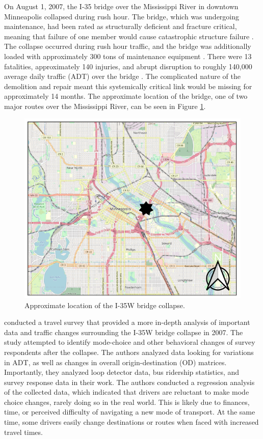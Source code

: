 On August 1, 2007, the I-35 bridge over the Mississippi River in downtown
Minneapolis collapsed
during rush hour. The bridge, which was undergoing maintenance, had been
rated as structurally
deficient and fracture critical, meaning that failure of one member would
cause catastrophic structure failure \citep{schaper2017}.
The collapse occurred during rush hour traffic, and the bridge
was additionally loaded
with approximately 300 tons of maintenance equipment \citep{schaper2017}.
There were 13
fatalities,
approximately 140 injuries, and abrupt disruption to roughly 140,000
average daily traffic (ADT)
over the bridge \citep{zhu2010}. The complicated nature of the demolition
and repair meant
this systemically critical link would be missing for approximately 14
months. The approximate
location of the bridge, one of two major routes over the Mississippi
River, can be seen in Figure \ref{fig:i35}.

\begin{figure}

{\centering \includegraphics[width=0.75\linewidth]{figures/chapter2/I-35W.png}

}

\caption{Approximate location of the I-35W bridge collapse.}\label{fig:i35}
\end{figure}

\citet{zhu2010} conducted a travel survey that provided a more in-depth
analysis of important data
and traffic changes surrounding the I-35W bridge collapse in 2007. The
study attempted to identify mode-choice and other behavioral changes of
survey respondents after the collapse. The
authors analyzed data looking for variations in ADT, as well as changes in overall origin-destination (OD) matrices.
Importantly, they analyzed loop detector data, bus ridership statistics, and survey response data in their work. The
authors conducted a regression analysis of the collected data,
which indicated that drivers are reluctant to make mode choice changes,
rarely doing so in the real world. This is
likely due to finances, time, or perceived difficulty of
navigating a new mode of
transport. At the same time, some drivers easily change destinations or routes when faced
with increased travel
times.

